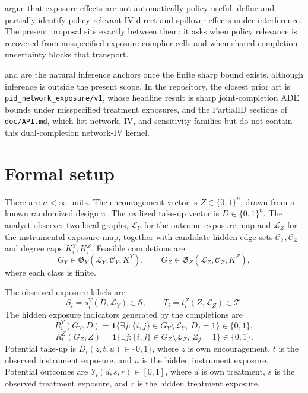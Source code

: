 \documentclass[11pt]{article}
\newcommand{\one}{\mathbf{1}}
\theoremstyle{definition}
\theoremstyle{plain}
\theoremstyle{remark}
\begin{document}
\citet{auerbach_auerbach_tabord_meehan_2024_exposure_policy_relevance} argue that exposure effects are not automatically policy useful. \citet{nibbering_oosterveen_2025_iv_interference_policy} define and partially identify policy-relevant IV direct and spillover effects under interference. The present proposal sits exactly between them: it asks when policy relevance is recovered from misspecified-exposure complier cells and when shared completion uncertainty blocks that transport.

\citet{imbens_manski_2004_ci_partial_id} and \citet{chernozhukov_hong_tamer_2007_parameter_sets} are the natural inference anchors once the finite sharp bound exists, although inference is outside the present scope. In the repository, the closest prior art is \texttt{pid\_network\_exposure/v1}, whose headline result is sharp joint-completion ADE bounds under misspecified treatment exposures, and the PartialID sections of \texttt{doc/API.md}, which list network, IV, and sensitivity families but do not contain this dual-completion network-IV kernel.

\section{Formal setup}
There are \(n<\infty\) units. The encouragement vector is \(Z\in\{0,1\}^n\), drawn from a known randomized design \(\pi\). The realized take-up vector is \(D\in\{0,1\}^n\). The analyst observes two local graphs, \(\mathcal L_Y\) for the outcome exposure map and \(\mathcal L_Z\) for the instrumental exposure map, together with candidate hidden-edge sets \(\mathcal C_Y,\mathcal C_Z\) and degree caps \(K^Y_i,K^Z_i\). Feasible completions are
\[
G_Y\in\mathfrak G_Y(\mathcal L_Y,\mathcal C_Y,K^Y),\qquad
G_Z\in\mathfrak G_Z(\mathcal L_Z,\mathcal C_Z,K^Z),
\]
where each class is finite.

The observed exposure labels are
\[
S_i=s_i^Y(D,\mathcal L_Y)\in\mathcal S,\qquad
T_i=t_i^Z(Z,\mathcal L_Z)\in\mathcal T.
\]
The hidden exposure indicators generated by the completions are
\[
R_i^Y(G_Y,D)=\one\{\exists j:\{i,j\}\in G_Y\setminus\mathcal L_Y,\ D_j=1\}\in\{0,1\},
\]
\[
R_i^Z(G_Z,Z)=\one\{\exists j:\{i,j\}\in G_Z\setminus\mathcal L_Z,\ Z_j=1\}\in\{0,1\}.
\]
Potential take-up is \(D_i(z,t,u)\in\{0,1\}\), where \(z\) is own encouragement, \(t\) is the observed instrument exposure, and \(u\) is the hidden instrument exposure. Potential outcomes are \(Y_i(d,s,r)\in[0,1]\), where \(d\) is own treatment, \(s\) is the observed treatment exposure, and \(r\) is the hidden treatment exposure.
\end{document}
